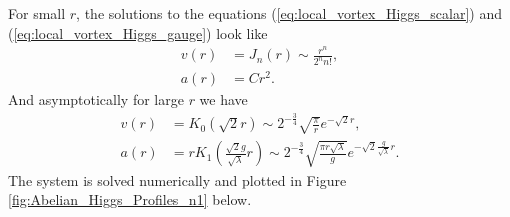     \indent For small $r$, the solutions to the equations (\ref{eq:local_vortex_Higgs_scalar}) and (\ref{eq:local_vortex_Higgs_gauge}) look like
    \begin{align}
        v(r)&= J_n(r) \sim \frac{r^n}{ 2^n n!}, \\
        a(r)&= C r^2.
    \end{align}
    And asymptotically for large $r$ we have
    \begin{align}
        v(r)&=K_0\left(\sqrt{2} r\right)\sim 2^{-\frac{3}{4}}\sqrt{\frac{\pi}{r}} e^{- \sqrt{2} r} , \label{eq:Asymptotics1_Abelian_Higgs} \\
        a(r)&=r K_1\left(\frac{\sqrt{2} g}{\sqrt{\lambda}} r \right)\sim 2^{- \frac{3}{4}} \sqrt{\frac{\pi r \sqrt{\lambda}}{g}} e^{- \sqrt{2} \frac{g}{\sqrt{\lambda}}r}. \label{eq:Asymptotics2_Abelian_Higgs}
    \end{align}
    The system is solved numerically and plotted in Figure \ref{fig:Abelian_Higgs_Profiles_n1} below.
